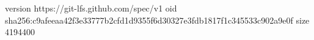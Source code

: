version https://git-lfs.github.com/spec/v1
oid sha256:c9afeeaa42f3e33777b2cfd1d9355f6d30327e3fdb1817f1c345533c902a9e0f
size 4194400
